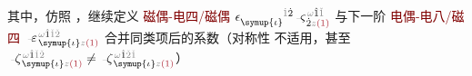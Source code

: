 其中，仿照 ，继续定义 \textcolor{Maroon}{磁偶-电四/磁偶} $\epsilon^{\hphantom{\symup{\iota}}\mathcolor{gray}{\dot{1}}\dot{2}}_{\symup{\iota}} \Xint{\begin{smallmatrix} ~ \\ {}^{}_{\mathcolor{gray}{-}} \\ ~ \end{smallmatrix}}{13}{\varsigma}^{\;\! \mathcolor{gray}{\omega} \hat{1} \mathcolor{gray}{\check{1}}}_{\;\! \dot{2} \mathcolor{gray}{z} \textcolor{Maroon}{(1)}}$ 与下一阶 \textcolor{Maroon}{电偶-电八/磁四} $\Xint{\begin{smallmatrix} ~ \\ {}^{}_{\mathcolor{gray}{-}} \\ ~ \end{smallmatrix}}{16}{\varepsilon}^{\;\! \mathcolor{gray}{\omega} \hat{1} \mathcolor{gray}{\check{1} \check{2}}}_{\;\! \symup{\iota} \mathcolor{gray}{z} \textcolor{Maroon}{(1)}}$ 合并同类项后的系数（对称性  不适用，甚至 $\Xint{\begin{smallmatrix} ~ \\ {}^{}_{\mathcolor{gray}{-}} \\ ~ \end{smallmatrix}}{12}{\zeta}^{\;\! \mathcolor{gray}{\omega} \hat{1} \mathcolor{gray}{\check{1} \check{2}}}_{\;\! \symup{\iota} \mathcolor{gray}{z} \textcolor{Maroon}{(1)}} \neq \Xint{\begin{smallmatrix} ~ \\ {}^{}_{\mathcolor{gray}{-}} \\ ~ \end{smallmatrix}}{12}{\zeta}^{\;\! \mathcolor{gray}{\omega} \hat{1} \mathcolor{gray}{\check{2} \check{1}}}_{\;\! \symup{\iota} \mathcolor{gray}{z} \textcolor{Maroon}{(1)}}$）
